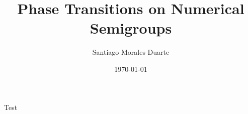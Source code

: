 \documentclass[a4paper, 12pt, twoside]{report}
\title{Phase Transitions on Numerical Semigroups}
\author{Santiago Morales Duarte}
\date{\today}
\theoremstyle{definition}
\theoremstyle{remark}
\begin{document}











\tableofcontents
\listoffigures
\listoftables




Test \cite{thesis_template}











\nocite{*}
\printbibliography

\appendix





\end{document}
